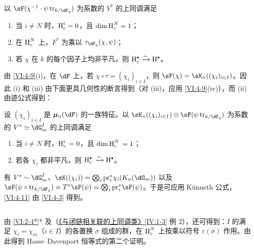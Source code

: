 \begin{proposition_}\label{VI:4-10}
以 $\sF(\chi^{-1}\cdot \psi\tr_{k/\dF_q})$ 为系数的 $V^\ast$ 的上同调满足
\begin{enumerate}[\indent (i)]
  \item 当 $i\ne N$ 时，$\operatorname{H}_c^i = 0$，且 $\dim \operatorname{H}_c^N=1$；
  \item 在 $\operatorname{H}_c^N$ 上，$F^\ast$ 为乘以 $\tau_{\dF_q}(\chi,\psi)$；
  \item 若 $\chi$ 在 $k$ 的每个因子上均非平凡，则 $\h_c^\bullet \iso \h^\bullet$。
\end{enumerate}
\end{proposition_}

由 \ref{VI:4-9}(i)，在 $\dF$ 上，若 $\chi\circ \tau=(\chi_i)_{i\in I}$，则 $\sF(\chi) = \sK_n((\chi_i)_{i\in I})$。因此 (i) 和 (iii) 由下面更具几何性的断言得到（对 (iii)，应用 \ref{VI:4-9}(iv)），而 (ii) 由迹公式得到：

\begin{proposition_}\label{VI:4-11}
设 $(\chi_i)_{i\in I}$ 是 $\dmu_n(\dF)$ 的一族特征。以 $\sK_n((\chi_i)_{i\in I})\otimes \sF(\psi\tr_{k/\dF_q})$ 为系数的 $V^\ast\simeq \dG_m^I$ 的上同调满足
\begin{enumerate}[\indent (i)]
  \item 当 $i\ne N$ 时，$\operatorname{H}_c^i{}=0$，且 $\dim \operatorname{H}_c^N{} = 1$；
  \item 若各 $\chi_i$ 都非平凡，则 $\h_c^\bullet{}\iso \h^\bullet$。
\end{enumerate}
\end{proposition_}

有 $V^\ast\sim \dG_m^I$、$\sK((\chi_i)) = \bigotimes_i \pr_i^\ast \chi_i(K_n(\dG_m))$ 以及 $\sF(\psi\circ \tr_{k/\dF_q})=T^\ast \sF(\psi) = \bigotimes_i \pr_i^\ast \sF(\psi)$。于是可应用 K\"unneth 公式，\ref{VI:4-11} 由 \ref{VI:4-3} 得到。

\subsection{}\label{VI:4-12}

由 \ref{VI:2-4*}* 及（\hyperref[IV]{《与闭链相关联的上同调类》}\ref{IV:1-3} 例 2），还可得到：$I$ 的满足 $\chi_i = \chi_{\sigma i}$（$i\in I$）的各置换 $\sigma$ 组成的群，在 $\operatorname{H}_c^N$ 上按乘以符号 $\varepsilon(\sigma)$ 作用。由此得到 Hasse--Davenport 恒等式的第二个证明。

